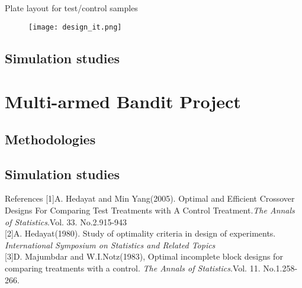 \documentclass{beamer}
\begin{document}
\begin{frame}{Plate layout for test/control samples}
    \begin{figure}
        \centering
        \texttt{[image: design\_it.png]}
        \label{fig:my_label}
    \end{figure}
\end{frame}




\subsection{Simulation studies}


\section{Multi-armed Bandit Project}
\subsection{Methodologies}
\subsection{Simulation studies}







\begin{frame}{References}
[1]A. Hedayat and Min Yang(2005). Optimal and Efficient Crossover Designs For Comparing Test Treatments with A Control Treatment.\textit{The Annals of Statistics}.Vol. 33. No.2.915-943\\

[2]A. Hedayat(1980). Study of optimality criteria in design of experiments. \textit{International Symposium on Statistics and Related Topics}\\

[3]D. Majumbdar and W.I.Notz(1983), Optimal incomplete block designs for comparing treatments with a control. \textit{The Annals of Statistics}.Vol. 11. No.1.258-266.
\end{frame}
\end{document}
